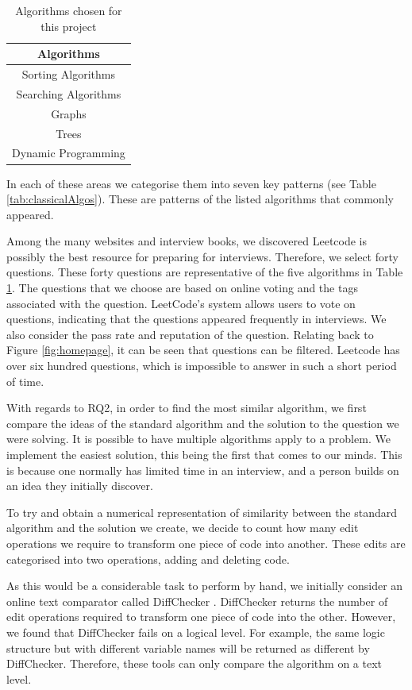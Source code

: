 \documentclass[conference]{IEEEtran}
\begin{document}
\begin{table}[H]
\centering
	\begin{tabular}{| c | } \hline
		  {\bf Algorithms} \\ \hline
		Sorting Algorithms\\ \hline
		Searching Algorithms\\ \hline
		Graphs  \\ \hline
		Trees  \\ \hline
		Dynamic Programming \\ \hline
	\end{tabular}
	\caption{Algorithms chosen for this project}
	\label{tab:fiveareas}
\end{table}
In each of these areas we categorise them into seven key patterns (see Table \ref{tab:classicalAlgos}). These are patterns of the listed algorithms that commonly appeared.
\par Among the many websites and interview books, we discovered Leetcode is possibly the best resource for preparing for interviews. Therefore, we select forty questions. These forty questions are representative of the five algorithms in Table \ref{tab:fiveareas}. The questions that we choose are based on online voting and the tags associated with the question. LeetCode's system allows users to vote on questions, indicating that the questions appeared frequently in interviews. We also consider the pass rate and reputation of the question. Relating back to Figure \ref{fig:homepage}, it can be seen that questions can be filtered. Leetcode has over six hundred questions, which is impossible to answer in such a short period of time. 
\par With regards to RQ2, in order to find the most similar algorithm, we first compare the ideas of the standard algorithm and the solution to the question we were solving. It is possible to have multiple algorithms apply to a problem. We implement the easiest solution, this being the first that comes to our minds. This is because one normally has limited time in an interview, and a person builds on an idea they initially discover.
\par To try and obtain a numerical representation of similarity between the standard algorithm and the solution we create, we decide to count how many edit operations we require to transform one piece of code into another. These edits are categorised into two operations, adding and deleting code.
\par As this would be a considerable task to perform by hand, we initially consider an online text comparator called DiffChecker \cite{diff}. DiffChecker returns the number of edit operations required to transform one piece of code into the other. However, we found that DiffChecker fails on a logical level. For example, the same logic structure but with different variable names will be returned as different by DiffChecker. Therefore, these tools can only compare the algorithm on a text level. 
\end{document}

